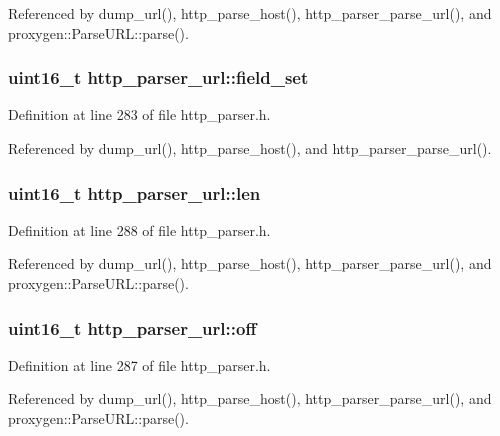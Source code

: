 Referenced by dump\+\_\+url(), http\+\_\+parse\+\_\+host(), http\+\_\+parser\+\_\+parse\+\_\+url(), and proxygen\+::\+Parse\+U\+R\+L\+::parse().

\subsubsection[{field\+\_\+set}]{\setlength{\rightskip}{0pt plus 5cm}uint16\+\_\+t http\+\_\+parser\+\_\+url\+::field\+\_\+set}\label{structhttp__parser__url_a77af61a480f11c41938810dd76ca49eb}


Definition at line 283 of file http\+\_\+parser.\+h.



Referenced by dump\+\_\+url(), http\+\_\+parse\+\_\+host(), and http\+\_\+parser\+\_\+parse\+\_\+url().

\subsubsection[{len}]{\setlength{\rightskip}{0pt plus 5cm}uint16\+\_\+t http\+\_\+parser\+\_\+url\+::len}\label{structhttp__parser__url_a60fb784a989dd5a95e5bd19d468d22c7}


Definition at line 288 of file http\+\_\+parser.\+h.



Referenced by dump\+\_\+url(), http\+\_\+parse\+\_\+host(), http\+\_\+parser\+\_\+parse\+\_\+url(), and proxygen\+::\+Parse\+U\+R\+L\+::parse().

\subsubsection[{off}]{\setlength{\rightskip}{0pt plus 5cm}uint16\+\_\+t http\+\_\+parser\+\_\+url\+::off}\label{structhttp__parser__url_a6510826f3aa9a1100ac5f714323edeb1}


Definition at line 287 of file http\+\_\+parser.\+h.



Referenced by dump\+\_\+url(), http\+\_\+parse\+\_\+host(), http\+\_\+parser\+\_\+parse\+\_\+url(), and proxygen\+::\+Parse\+U\+R\+L\+::parse().

